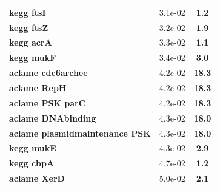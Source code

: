 \begin{landscape}
\begin{table}
{\begin{minipage}[t]{0.3\textwidth}
\begin{tabular}{>{\bfseries}p{\textwidth}cc}
\rowcolor{posit2}kegg ftsI&3.1e-02&\textbf{\colorbox{colorpower}{1.2}}\\
\rowcolor{posit2}kegg ftsZ&3.2e-02&\textbf{\colorbox{colorpower}{1.9}}\\
\rowcolor{posit2}kegg acrA&3.3e-02&\textbf{\colorbox{colorpower}{1.1}}\\
\rowcolor{posit2}kegg mukF&3.4e-02&\textbf{\colorbox{colorpowerx}{3.0}}\\
\rowcolor{posit2}aclame cdc6archee&4.2e-02&\textbf{\colorbox{colorpowerxx}{18.3}}\\
\rowcolor{posit2}aclame RepH&4.2e-02&\textbf{\colorbox{colorpowerxx}{18.3}}\\
\rowcolor{posit2}aclame PSK parC&4.2e-02&\textbf{\colorbox{colorpowerxx}{18.3}}\\
\rowcolor{posit2}aclame DNAbinding&4.3e-02&\textbf{\colorbox{colorpowerxx}{18.0}}\\
\rowcolor{posit2}aclame plasmidmaintenance PSK&4.3e-02&\textbf{\colorbox{colorpowerxx}{18.0}}\\
\rowcolor{posit2}kegg mukE&4.3e-02&\textbf{\colorbox{colorpowerx}{2.9}}\\
\rowcolor{posit2}kegg cbpA&4.7e-02&\textbf{\colorbox{colorpower}{1.2}}\\
\rowcolor{posit2}aclame XerD&5.0e-02&\textbf{\colorbox{colorpower}{2.1}}\\
\end{tabular}
	\end{minipage}}
	\hspace{1.7cm}
\end{table}
\end{landscape}
